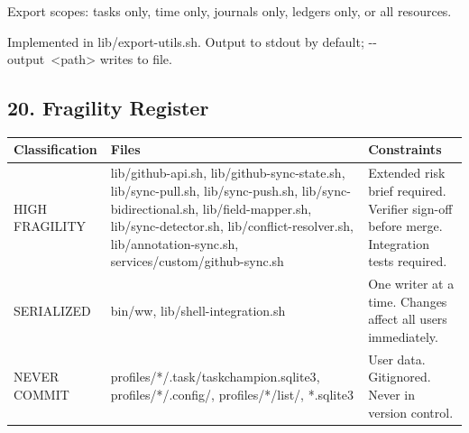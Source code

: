 \documentclass[11pt, a4paper, DIV=14]{scrartcl}
\renewcommand{\texttt}[1]{{\ttfamily\fontsize{8.5}{10.5}\selectfont\color{BabbNavy}#1}}
\let\origRule\rule
\renewcommand{\rule}[2]{\par\noindent{\color{BabbBorder}\origRule{#1}{#2}}\par}
\begin{document}
Export scopes: tasks only, time only, journals only, ledgers only, or
all resources.

Implemented in \texttt{lib/export-utils.sh}. Output to stdout by
default; \texttt{-\/-output\ \textless{}path\textgreater{}} writes to
file.

\begin{center}\rule{0.5\linewidth}{0.5pt}\end{center}

\subsection{20. Fragility Register}\label{fragility-register}

{\def\LTcaptype{none} %
\begin{longtable}[]{@{}
  >{\raggedright\arraybackslash}p{}
  >{\raggedright\arraybackslash}p{}
  >{\raggedright\arraybackslash}p{}@{}}
\toprule\noalign{}
\begin{minipage}[b]{\linewidth}\raggedright
Classification
\end{minipage} & \begin{minipage}[b]{\linewidth}\raggedright
Files
\end{minipage} & \begin{minipage}[b]{\linewidth}\raggedright
Constraints
\end{minipage} \\
\midrule\noalign{}
\endhead
\bottomrule\noalign{}
\endlastfoot
HIGH FRAGILITY & \texttt{lib/github-api.sh},
\texttt{lib/github-sync-state.sh}, \texttt{lib/sync-pull.sh},
\texttt{lib/sync-push.sh}, \texttt{lib/sync-bidirectional.sh},
\texttt{lib/field-mapper.sh}, \texttt{lib/sync-detector.sh},
\texttt{lib/conflict-resolver.sh}, \texttt{lib/annotation-sync.sh},
\texttt{services/custom/github-sync.sh} & Extended risk brief required.
Verifier sign-off before merge. Integration tests required. \\
SERIALIZED & \texttt{bin/ww}, \texttt{lib/shell-integration.sh} & One
writer at a time. Changes affect all users immediately. \\
NEVER COMMIT & \texttt{profiles/*/.task/taskchampion.sqlite3},
\texttt{profiles/*/.config/}, \texttt{profiles/*/list/},
\texttt{*.sqlite3} & User data. Gitignored. Never in version control. \\
\end{longtable}
}
\end{document}

